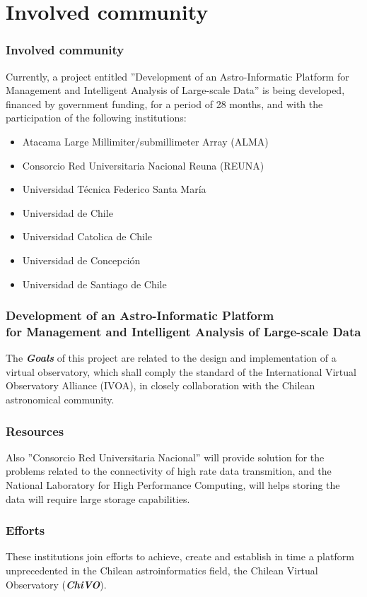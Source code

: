 \section{Involved community}

\begin{frame}
\frametitle{Involved community}
Currently, a project entitled ”Development of an Astro-Informatic Platform for Management and
Intelligent Analysis of Large-scale Data” is being developed, financed by government funding, for a period of 28 months,
and with the participation of the following institutions:
\begin{itemize}
	\addtolength{\itemindent}{1cm}
	\item Atacama Large Millimiter/submillimeter Array (ALMA)
	\item Consorcio Red Universitaria Nacional Reuna (REUNA)
	\item Universidad Técnica Federico Santa María
	\item Universidad de Chile
	\item Universidad Catolica de Chile
	\item Universidad de Concepción
	\item Universidad de Santiago de Chile
\end{itemize}
\end{frame}




\begin{frame}
\frametitle{Development of an Astro-Informatic Platform \\for Management and Intelligent Analysis of Large-scale Data}

The \emph{\textbf{Goals}} of this project are related to the design and implementation of a virtual observatory, which
shall comply the standard of the International Virtual Observatory Alliance (IVOA), in closely collaboration with the
Chilean astronomical community.

\end{frame}


\begin{frame}
\frametitle{Resources}
Also ”Consorcio Red Universitaria Nacional” will provide solution for the problems related to the connectivity of high
rate data transmition, and the National Laboratory for High Performance Computing, will helps storing the data will require large storage
capabilities.
\end{frame}


\begin{frame}
\frametitle{Efforts}
These institutions join efforts to achieve, create and establish in time a platform unprecedented in the
Chilean astroinformatics field, the Chilean Virtual Observatory (\emph{\textbf{ChiVO}}).
\end{frame}

